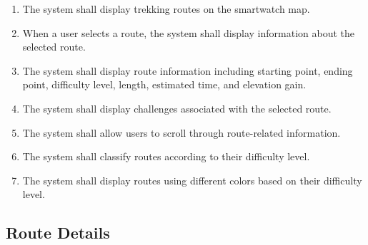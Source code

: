 \begin{enumerate}[label=\textbf{FR\arabic*}, ref=FR\arabic*, resume]

\item \label{fr-watch:fr5}
The system shall display trekking routes on the smartwatch map.

\item \label{fr-watch:fr6}
When a user selects a route, the system shall display information about the selected route.

\item \label{fr-watch:fr7}
The system shall display route information including starting point, ending point, difficulty level, length, estimated time, and elevation gain.

\item \label{fr-watch:fr8}
The system shall display challenges associated with the selected route.

\item \label{fr-watch:fr9}
The system shall allow users to scroll through route-related information.

\item \label{fr-watch:fr10}
The system shall classify routes according to their difficulty level.

\item \label{fr-watch:fr11}
The system shall display routes using different colors based on their difficulty level.

\end{enumerate}


\subsection{Route Details}

